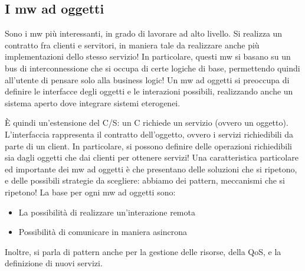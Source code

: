 \subsection{I mw ad oggetti}
Sono i mw più interessanti, in grado di lavorare ad alto livello. Si realizza un contratto fra clienti e servitori,
in maniera tale da realizzare anche più implementazioni dello stesso servizio! In particolare, questi mw si basano su
un bus di interconnessione che si occupa di certe logiche di base, permettendo quindi all'utente di pensare solo alla
business logic! Un mw ad oggetti si preoccupa di definire le interfacce degli oggetti e le interazioni possibili,
realizzando anche un sistema aperto dove integrare sistemi eterogenei.

È quindi un'estensione del C/S: un C richiede un servizio (ovvero un oggetto). L'interfaccia rappresenta il contratto
dell'oggetto, ovvero i servizi richiedibili da parte di un client. In particolare, si possono definire delle operazioni
richiedibili sia dagli oggetti che dai clienti per ottenere servizi!
Una caratteristica particolare ed importante dei mw ad oggetti è che presentano delle soluzioni che si ripetono, e
delle possibili strategie da scegliere: abbiamo dei pattern, meccanismi che si ripetono!
La base per ogni mw ad oggetti sono:
\begin{itemize}
 \item La possibilità di realizzare un'interazione remota
 \item Possibilità di comunicare in maniera asincrona
\end{itemize}
Inoltre, si parla di pattern anche per la gestione delle risorse, della QoS, e la definizione di nuovi servizi.
